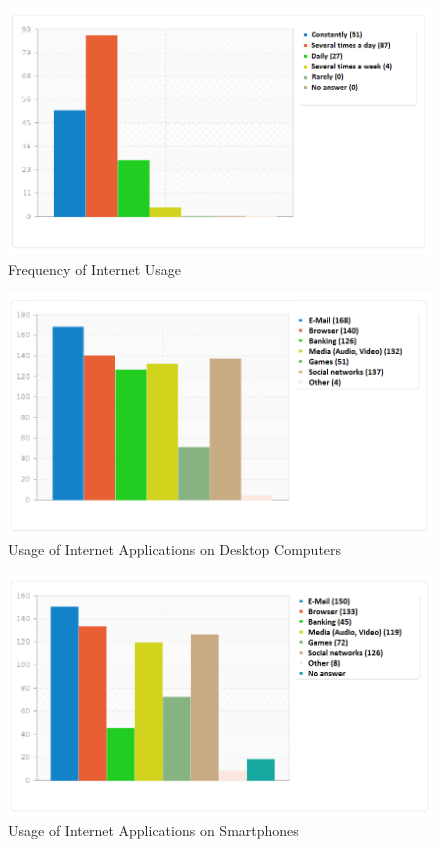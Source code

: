 

\begin{figure}[hHtbp]
\includegraphics[width=1.0\textwidth]{graphix/internet_usage.png}%
\caption{Frequency of Internet Usage}%
\label{fig:internet_usage}%
\end{figure}


\begin{figure}[hHtbp]
\includegraphics[width=1.0\textwidth]{graphix/desktop_applications.png}%
\caption{Usage of Internet Applications on Desktop Computers}%
\label{fig:desktop_apps}%
\end{figure}

\begin{figure}[hHtbp]
\includegraphics[width=1.0\textwidth]{graphix/smartphone_applications.png}%
\caption{Usage of Internet Applications on Smartphones}%
\label{fig:smartphone_apps}%
\end{figure}